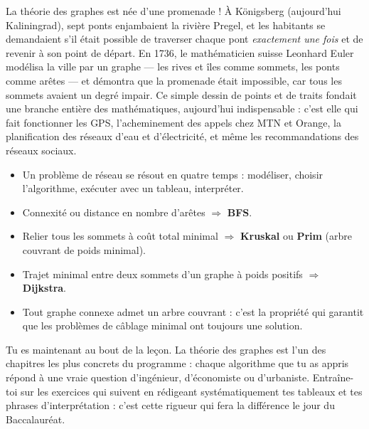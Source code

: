 \documentclass[11pt]{article}
\newcommand{\cle}[1]{{\popxbold\color{popdark}#1}}
\begin{document}
\begin{savaistu}
La théorie des graphes est née d'une promenade ! À Königsberg (aujourd'hui Kaliningrad), sept ponts enjambaient la rivière Pregel, et les habitants se demandaient s'il était possible de traverser chaque pont \emph{exactement une fois} et de revenir à son point de départ. En 1736, le mathématicien suisse \cle{Leonhard Euler} modélisa la ville par un graphe — les rives et îles comme sommets, les ponts comme arêtes — et démontra que la promenade était impossible, car tous les sommets avaient un degré impair. Ce simple dessin de points et de traits fondait une branche entière des mathématiques, aujourd'hui indispensable : c'est elle qui fait fonctionner les GPS, l'acheminement des appels chez MTN et Orange, la planification des réseaux d'eau et d'électricité, et même les recommandations des réseaux sociaux.
\end{savaistu}

\begin{aretenir}
\begin{itemize}
\item Un problème de réseau se résout en quatre temps : \cle{modéliser}, \cle{choisir} l'algorithme, \cle{exécuter} avec un tableau, \cle{interpréter}.
\item Connexité ou distance en nombre d'arêtes $\Rightarrow$ \textbf{BFS}.
\item Relier tous les sommets à coût total minimal $\Rightarrow$ \textbf{Kruskal} ou \textbf{Prim} (arbre couvrant de poids minimal).
\item Trajet minimal entre deux sommets d'un graphe à poids positifs $\Rightarrow$ \textbf{Dijkstra}.
\item Tout graphe connexe admet un arbre couvrant : c'est la propriété qui garantit que les problèmes de câblage minimal ont toujours une solution.
\end{itemize}
\end{aretenir}

Tu es maintenant au bout de la leçon. La théorie des graphes est l'un des chapitres les plus concrets du programme : chaque algorithme que tu as appris répond à une vraie question d'ingénieur, d'économiste ou d'urbaniste. Entraîne-toi sur les exercices qui suivent en rédigeant systématiquement tes tableaux et tes phrases d'interprétation : c'est cette rigueur qui fera la différence le jour du Baccalauréat.

\newpage
\end{document}
